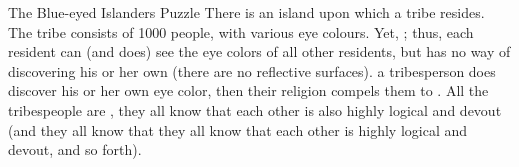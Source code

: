 
\begin{frame}{}
\end{frame}

\begin{frame}{}
\end{frame}

\begin{frame}{}
  \begin{exampleblock}{The Blue-eyed Islanders Puzzle}
    There is an island upon which a tribe resides. \pause
    The tribe consists of 1000 people, with various eye colours. \pause
    Yet, ; \pause
    thus, each resident can (and does) see the eye colors of all other residents,
    but has no way of discovering his or her own (there are no reflective surfaces). \pause
     a tribesperson does discover his or her own eye color,
    then their religion compels them to
    . \pause
    All the tribespeople are ,
     they all know that each other is also highly logical and devout
    (and they all know that they all know that each other is highly logical and devout,
    and so forth).
  \end{exampleblock}
\end{frame}


